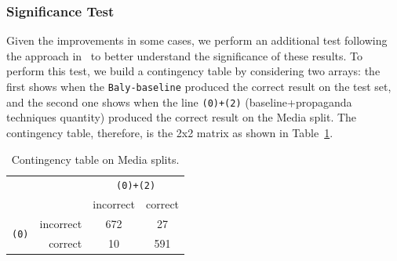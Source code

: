 
\subsubsection{Significance Test}

Given the improvements in some cases, we perform an additional test following the approach in~\citet{mcnemar1947note} 
to better understand the significance of these results. %
To perform this test, we build a contingency table by considering two arrays: the first shows when the \texttt{Baly-baseline} produced the correct result on the test set, and the second one shows when the line \texttt{(0)+(2)} (baseline+propaganda techniques quantity) produced the correct result on the Media split. The contingency table, therefore, is the 2x2 matrix as shown in 
Table~\ref{tab:contingency2}.


\begin{table}[!htbp]
    \centering
\small
    \begin{tabular}{rr|c|c}
        & & \multicolumn{2}{c}{\texttt{(0)+(2)}} \\
         & & incorrect & correct \\
         \hline
        \multirow{2}{*}{\texttt{(0)}} & incorrect & 672 & 27 \\
        & correct & 10 & 591
    \end{tabular}
    \caption{Contingency table on Media splits.}
    \label{tab:contingency2}
\end{table}



